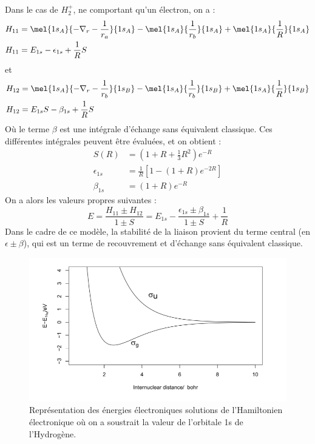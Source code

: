 Dans le cas de $H_2^+$, ne comportant qu'un électron, on a :
\begin{equation*}
    \begin{split}
        H_{11} &= \mel{1s_A}{-\nabla_r-\frac{1}{r_a}}{1s_A} - \mel{1s_A}{\frac{1}{r_b}}{1s_A} + \mel{1s_A}{\frac{1}{R}}{1s_A}\\
        H_{11} &= E_{1s}-\epsilon_{1s}+\frac{1}{R}S
    \end{split}
\end{equation*}
et
\begin{equation*}
    \begin{split}
        H_{12} &= \mel{1s_A}{-\nabla_r-\frac{1}{r_b}}{1s_B} - \mel{1s_A}{\frac{1}{r_b}}{1s_B} + \mel{1s_A}{\frac{1}{R}}{1s_B}\\
        H_{12} &= E_{1s}S-\beta_{1s} + \frac{1}{R}S
    \end{split}
\end{equation*}
Où le terme $\beta$ est une intégrale d'échange sans équivalent classique.\newline
Ces différentes intégrales peuvent être évaluées, et on obtient :
\begin{equation*}
    \begin{split}
        S(R) &= (1+R+\frac{1}{3}R^2)e^{-R}\\
        \epsilon_{1s} &= \frac{1}{R}[1-(1+R)e^{-2R}]\\
        \beta_{1s} &= (1+R)e^{-R}
    \end{split}
\end{equation*}
On a alors les valeurs propres suivantes : 
\begin{equation*}
    E = \frac{H_{11} \pm H_{12}}{1\pm S} = E_{1s} - \frac{\epsilon_{1s}\pm\beta_{1s}}{1\pm S} +\frac{1}{R}
\end{equation*}
Dans le cadre de ce modèle, la stabilité de la liaison provient du terme central (en $\epsilon\pm\beta$), qui est un terme de recouvrement et d'échange sans équivalent classique.\newline
\begin{figure}[ht]
    \centering
    \includegraphics[scale = 0.8]{Images3/LCAOHamiltonien.PNG}
    \caption{Représentation des énergies électroniques solutions de l’Hamiltonien
électronique où on a soustrait la valeur de l’orbitale 1s de l’Hydrogène.}
    \label{fig:Ham}
\end{figure}

